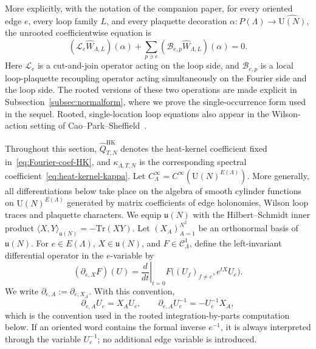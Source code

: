 \documentclass[11pt,a4paper,reqno]{amsart}
\theoremstyle{definition}
\theoremstyle{remark}
\newcommand\U{{\mathrm U}}
\newcommand\Tr{{\mathrm{Tr}}}
\newcommand\HK{{\mathrm{HK}}}
\begin{document}
More explicitly, with the notation of the companion paper, for every oriented edge $e$, every loop family $L$, and every plaquette decoration $\alpha:P(\Lambda)\to\widehat{\U(N)}$, the unrooted coefficientwise equation is
\begin{equation}\label{eq:coeffwise-MLE}
(\mathscr L_e\widehat W_{\Lambda,L})(\alpha)
+
\sum_{p\ni e}(\mathscr B_{e,p}\widehat W_{\Lambda,L})(\alpha)=0.
\end{equation}
Here $\mathscr L_e$ is a cut-and-join operator acting on the loop side, and $\mathscr B_{e,p}$ is a local loop-plaquette recoupling operator acting simultaneously on the Fourier side and the loop side. The rooted versions of these two operations are made explicit in Subsection~\ref{subsec:normalform}, where we prove the single-occurrence form used in the sequel. Rooted, single-location loop equations also appear in the Wilson-action setting of Cao--Park--Sheffield~\cite{CPS25}.



Throughout this section, $\widehat Q^{\HK}_{T,N}$ denotes the heat-kernel coefficient fixed in~\eqref{eq:Fourier-coef-HK}, and $\kappa_{\Lambda,T,N}$ is the corresponding spectral coefficient~\eqref{eq:heat-kernel-kappa}. Let $C^\infty_\Lambda=C^\infty(\U(N)^{E(\Lambda)})$. More generally, all differentiations below take place on the algebra of smooth cylinder functions on $\U(N)^{E(\Lambda)}$ generated by matrix coefficients of edge holonomies, Wilson loop traces and plaquette characters. We equip $\mathfrak u(N)$ with the Hilbert--Schmidt inner product $\langle X,Y\rangle_{\mathfrak u(N)}=-\Tr(XY).$ Let $(X_A)_{A=1}^{N^2}$ be an orthonormal basis of $\mathfrak u(N)$. For $e\in E(\Lambda)$, $X\in\mathfrak u(N)$, and $F\in\mathcal C^1_\Lambda$, define the left-invariant differential operator in the $e$-variable by
\[
(\partial_{e,X}F)(U)=\left.\frac{d}{dt}\right|_{t=0}F\bigl((U_f)_{f\neq e}, e^{tX}U_e\bigr).
\]
We write $\partial_{e,A}:=\partial_{e,X_A}$. With this convention,
\[
\partial_{e,A}U_e=X_AU_e,\qquad\partial_{e,A}U_e^{-1}=-U_e^{-1}X_A,
\]
which is the convention used in the rooted integration-by-parts computation below. If an oriented word contains the formal inverse $e^{-1}$, it is always interpreted through the variable $U_e^{-1}$; no additional edge variable is introduced.
\end{document}
